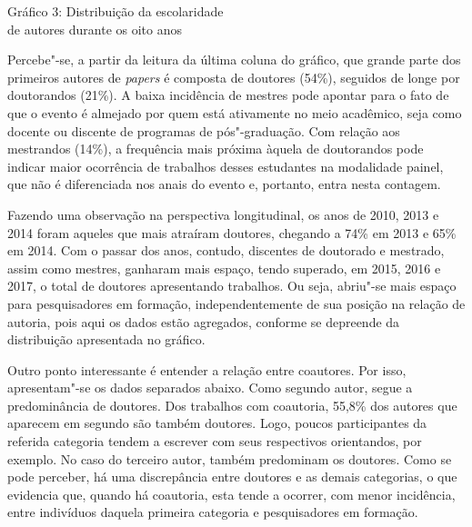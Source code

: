 \begin{center}
Gráfico 3: Distribuição da escolaridade\\ de autores durante os oito anos
\end{center}


Percebe"-se, a partir da leitura da última coluna do gráfico, que grande
parte dos primeiros autores de \emph{papers} é composta de
doutores (54\%), seguidos de longe por doutorandos (21\%). A
baixa incidência de mestres pode apontar para o fato de que o evento
é almejado por quem está ativamente no meio acadêmico, seja como docente
ou discente de programas de pós"-graduação. Com relação aos
mestrandos (14\%), a frequência mais próxima àquela de doutorandos
pode indicar maior ocorrência de trabalhos desses estudantes na
modalidade painel, que não é diferenciada nos anais do evento e,
portanto, entra nesta contagem.

Fazendo uma observação na perspectiva longitudinal, os anos de 2010,
2013 e 2014 foram aqueles que mais atraíram doutores, chegando a 74\%
em 2013 e 65\% em 2014. Com o passar dos anos, contudo, discentes de
doutorado e mestrado, assim como mestres, ganharam mais espaço, tendo
superado, em 2015, 2016 e 2017, o total de doutores apresentando
trabalhos. Ou seja, abriu"-se mais espaço para pesquisadores em
formação, independentemente de sua posição na relação de autoria, pois
aqui os dados estão agregados, conforme se depreende da distribuição
apresentada no gráfico.

Outro ponto interessante é entender a relação entre coautores. Por
isso, apresentam"-se os dados separados abaixo. Como segundo autor,
segue a predominância de doutores. Dos trabalhos com coautoria,
55,8\% dos autores que aparecem em segundo são também doutores.
Logo, poucos participantes da referida categoria tendem a escrever com
seus respectivos orientandos, por exemplo. No caso do
terceiro autor, também predominam os doutores. Como se pode
perceber, há uma discrepância entre doutores e as demais categorias,
o que evidencia que, quando há coautoria, esta tende a ocorrer, com
menor incidência, entre indivíduos daquela primeira categoria e
pesquisadores em formação.

